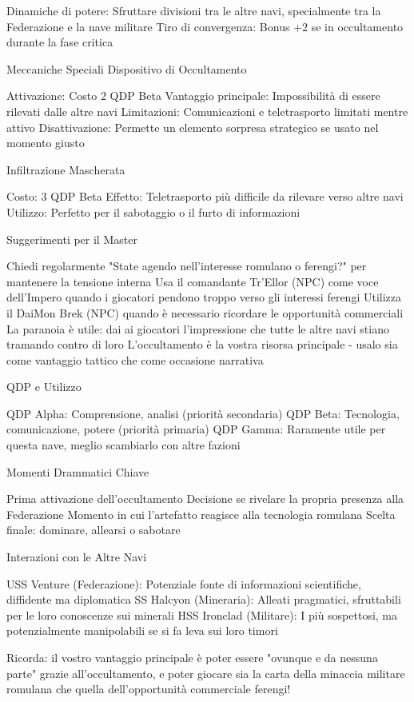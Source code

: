 \documentclass[letterpaper,twocolumn,openany,nodeprecatedcode]{dndbook}
\begin{document}
Dinamiche di potere: Sfruttare divisioni tra le altre navi, specialmente tra la Federazione e la nave militare
Tiro di convergenza: Bonus +2 se in occultamento durante la fase critica

Meccaniche Speciali
Dispositivo di Occultamento

Attivazione: Costo 2 QDP Beta
Vantaggio principale: Impossibilità di essere rilevati dalle altre navi
Limitazioni: Comunicazioni e teletrasporto limitati mentre attivo
Disattivazione: Permette un elemento sorpresa strategico se usato nel momento giusto

Infiltrazione Mascherata

Costo: 3 QDP Beta
Effetto: Teletrasporto più difficile da rilevare verso altre navi
Utilizzo: Perfetto per il sabotaggio o il furto di informazioni

Suggerimenti per il Master

Chiedi regolarmente "State agendo nell'interesse romulano o ferengi?" per mantenere la tensione interna
Usa il comandante Tr'Ellor (NPC) come voce dell'Impero quando i giocatori pendono troppo verso gli interessi ferengi
Utilizza il DaiMon Brek (NPC) quando è necessario ricordare le opportunità commerciali
La paranoia è utile: dai ai giocatori l'impressione che tutte le altre navi stiano tramando contro di loro
L'occultamento è la vostra risorsa principale - usalo sia come vantaggio tattico che come occasione narrativa

QDP e Utilizzo

QDP Alpha: Comprensione, analisi (priorità secondaria)
QDP Beta: Tecnologia, comunicazione, potere (priorità primaria)
QDP Gamma: Raramente utile per questa nave, meglio scambiarlo con altre fazioni

Momenti Drammatici Chiave

Prima attivazione dell'occultamento
Decisione se rivelare la propria presenza alla Federazione
Momento in cui l'artefatto reagisce alla tecnologia romulana
Scelta finale: dominare, allearsi o sabotare

Interazioni con le Altre Navi

USS Venture (Federazione): Potenziale fonte di informazioni scientifiche, diffidente ma diplomatica
SS Halcyon (Mineraria): Alleati pragmatici, sfruttabili per le loro conoscenze sui minerali
HSS Ironclad (Militare): I più sospettosi, ma potenzialmente manipolabili se si fa leva sui loro timori

Ricorda: il vostro vantaggio principale è poter essere "ovunque e da nessuna parte" grazie all'occultamento, e poter giocare sia la carta della minaccia militare romulana che quella dell'opportunità commerciale ferengi!
\end{document}

